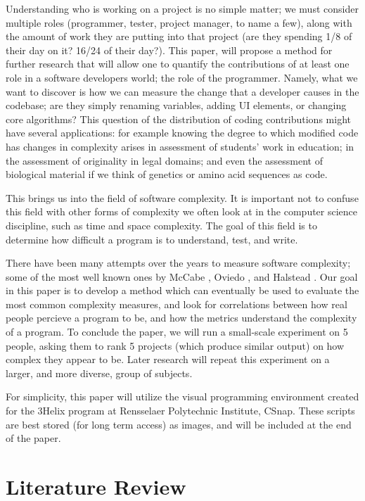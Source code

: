 \documentclass[]{article}
\begin{document}
Understanding who is working on a project is no simple matter; we must consider multiple roles (programmer, tester, project manager, to name a few), along with the amount of work they are putting into that project (are they spending 1/8 of their day on it? 16/24 of their day?).
This paper, will propose a method for further research that will allow one to quantify the contributions of at least one role in a software developers world; the role of the programmer.
Namely, what we want to discover is how we can measure the change that a developer causes in the codebase; are they simply renaming variables, adding UI elements, or changing core algorithms?
This question of the distribution of coding contributions might have several applications: for example knowing the degree to which modified code has changes in complexity arises in assessment of students' work in education; in the assessment of originality in legal domains; and even the assessment of  biological material if we think of genetics or amino acid sequences as code.

This brings us into the field of software complexity.
It is important not to confuse this field with other forms of complexity we often look at in the computer science discipline, such as time and space complexity.
The goal of this field is to determine how difficult a program is to understand, test, and write.

There have been many attempts over the years to measure software complexity; some of the most well known ones by McCabe \cite{ref:a_complexity_measure}, Oviedo \cite{ref:oviedo1993control}, and Halstead \cite{ref:halstead1977elements}.
Our goal in this paper is to develop a method which can eventually be used to evaluate the most common complexity measures, and look for correlations between how real people percieve a program to be, and how the metrics understand the complexity of a program.
To conclude the paper, we will run a small-scale experiment on 5 people, asking them to rank 5 projects (which produce similar output) on how complex they appear to be.
Later research will repeat this experiment on a larger, and more diverse, group of subjects.

For simplicity, this paper will utilize the visual programming environment created for the 3Helix program at Rensselaer Polytechnic Institute, CSnap.
These scripts are best stored (for long term access) as images, and will be included at the end of the paper.

\section{Literature Review}
\end{document}

